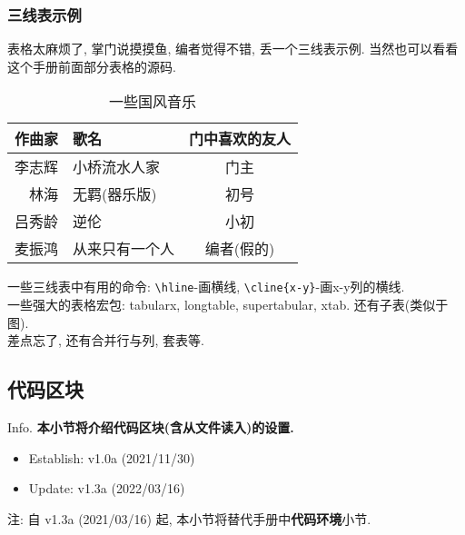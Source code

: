\documentclass[hyperref, UTF8, CJK, aspectratio=169]{beamer}
\begin{document}
\cprotEnv\begin{frame}
	\frametitle{三线表示例}
	表格太麻烦了, 掌门说摸摸鱼, 编者觉得不错, 丢一个三线表示例. 当然也可以看看这个手册前面部分表格的源码.
	\begin{table}[htbp]
		\centering
		\caption{一些国风音乐}
		\label{tab:YixieGfyy}
		\begin{tabular}{rlc}
			\toprule
			作曲家 & 歌名 & 门中喜欢的友人 \\
			\midrule
			李志辉 & 小桥流水人家 & 门主 \\
			林海 & 无羁(器乐版) & 初号 \\
			吕秀龄 & 逆伦 & 小初 \\
			麦振鸿 & 从来只有一个人 & 编者(假的) \\
			\bottomrule
		\end{tabular}
	\end{table}
	一些三线表中有用的命令: \verb|\hline|-画横线, \verb|\cline|\verb!{x-y}!-画x-y列的横线.\\
	一些强大的表格宏包: tabularx, longtable, supertabular, xtab. 还有子表(类似于图).\\
	差点忘了, 还有合并行与列, 套表等.
\end{frame}

\subsection{代码区块}
\begin{frame}{Info.}
	\textbf{本小节将介绍代码区块(含从文件读入)的设置.}
	\begin{multicols}{2}
		\begin{itemize}
			\item Establish: \textcolor{scugreen}{v1.0a (2021/11/30)}
			\item Update: \textcolor{scugreen}{v1.3a (2022/03/16)}
		\end{itemize}
	\end{multicols}
	注: 自 \textcolor{scugreen}{v1.3a (2021/03/16)} 起, 本小节将替代手册中\alert{\textbf{代码环境}}小节.\par
	\mycopyright
\end{frame}
\end{document}
